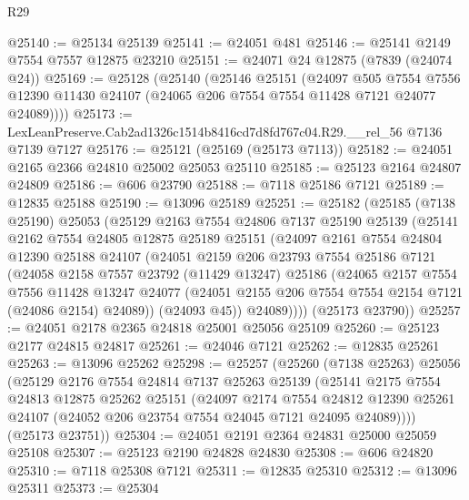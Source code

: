 \begin{lexlean}{R29}
\begin{coremodule}
@25140 := @25134 @25139
@25141 := @24051 @481
@25146 := @25141 @2149 @7554 @7557 @12875 @23210
@25151 := @24071 @24 @12875 (@7839 (@24074 @24))
@25169 := @25128
    (@25140
      (@25146
        @25151
        (@24097
          @505
          @7554
          @7556
          @12390
          @11430
          @24107
          (@24065 @206 @7554 @7554 @11428 @7121 @24077 @24089))))
@25173 := LexLeanPreserve.Cab2ad1326c1514b8416cd7d8fd767c04.R29.__rel_56 @7136 @7139 @7127
@25176 := @25121 (@25169 (@25173 @7113))
@25182 := @24051 @2165 @2366 @24810 @25002 @25053 @25110
@25185 := @25123 @2164 @24807 @24809
@25186 := @606 @23790
@25188 := @7118 @25186 @7121
@25189 := @12835 @25188
@25190 := @13096 @25189
@25251 := @25182
    (@25185
      (@7138 @25190)
      @25053
      (@25129
        @2163
        @7554
        @24806
        @7137
        @25190
        @25139
        (@25141
          @2162
          @7554
          @24805
          @12875
          @25189
          @25151
          (@24097
            @2161
            @7554
            @24804
            @12390
            @25188
            @24107
            (@24051
              @2159
              @206
              @23793
              @7554
              @25186
              @7121
              (@24058
                @2158
                @7557
                @23792
                (@11429 @13247)
                @25186
                (@24065
                  @2157
                  @7554
                  @7556
                  @11428
                  @13247
                  @24077
                  (@24051 @2155 @206 @7554 @7554 @2154 @7121 (@24086 @2154) @24089))
                (@24093 @45))
              @24089))))
      (@25173 @23790))
@25257 := @24051 @2178 @2365 @24818 @25001 @25056 @25109
@25260 := @25123 @2177 @24815 @24817
@25261 := @24046 @7121
@25262 := @12835 @25261
@25263 := @13096 @25262
@25298 := @25257
    (@25260
      (@7138 @25263)
      @25056
      (@25129
        @2176
        @7554
        @24814
        @7137
        @25263
        @25139
        (@25141
          @2175
          @7554
          @24813
          @12875
          @25262
          @25151
          (@24097
            @2174
            @7554
            @24812
            @12390
            @25261
            @24107
            (@24052 @206 @23754 @7554 @24045 @7121 @24095 @24089))))
      (@25173 @23751))
@25304 := @24051 @2191 @2364 @24831 @25000 @25059 @25108
@25307 := @25123 @2190 @24828 @24830
@25308 := @606 @24820
@25310 := @7118 @25308 @7121
@25311 := @12835 @25310
@25312 := @13096 @25311
@25373 := @25304

\end{coremodule}
\end{lexlean}
